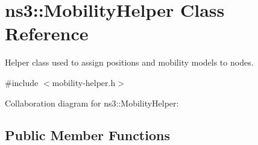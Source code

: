 \hypertarget{classns3_1_1MobilityHelper}{}\section{ns3\+:\+:Mobility\+Helper Class Reference}
\label{classns3_1_1MobilityHelper}


Helper class used to assign positions and mobility models to nodes.  




{\ttfamily \#include $<$mobility-\/helper.\+h$>$}



Collaboration diagram for ns3\+:\+:Mobility\+Helper\+:
\subsection*{Public Member Functions}
